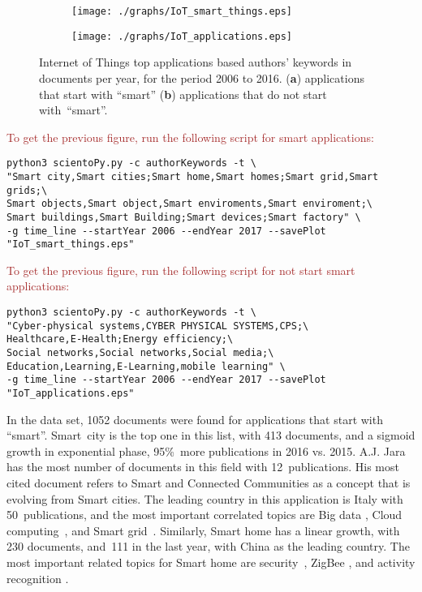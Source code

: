 \documentclass[symmetry,article,accept,moreauthors,pdftex10pt,a4paper]{mdpi}
\begin{document}
\begin{figure}[H]
	\centering
	\begin{subfigure}[b]{0.49\textwidth}
		\texttt{[image: ./graphs/IoT\_smart\_things.eps]}
		\caption{}
		\label{fig_smart_things}
	\end{subfigure}
	\begin{subfigure}[b]{0.49\textwidth}
		\texttt{[image: ./graphs/IoT\_applications.eps]}
		\caption{}
		\label{fig_applications_a}
	\end{subfigure}
	\vspace{-12pt}

	\caption{Internet of Things top applications based authors' keywords in documents per year, for the period 2006 to 2016.  (\textbf{a}) applications that start with ``smart'' (\textbf{b}) applications that do not start with~``smart''.}
	\label{fig_applications}
\end{figure}

\noindent
\textcolor{brown}{To get the previous figure, run the following script for smart applications:}\\
\begin{verbatim}
python3 scientoPy.py -c authorKeywords -t \
"Smart city,Smart cities;Smart home,Smart homes;Smart grid,Smart grids;\
Smart objects,Smart object,Smart enviroments,Smart enviroment;\
Smart buildings,Smart Building;Smart devices;Smart factory" \
-g time_line --startYear 2006 --endYear 2017 --savePlot "IoT_smart_things.eps"
\end{verbatim}

\noindent
\textcolor{brown}{To get the previous figure, run the following script for not start smart applications:}\\
\begin{verbatim}
python3 scientoPy.py -c authorKeywords -t \
"Cyber-physical systems,CYBER PHYSICAL SYSTEMS,CPS;\
Healthcare,E-Health;Energy efficiency;\
Social networks,Social networks,Social media;\
Education,Learning,E-Learning,mobile learning" \
-g time_line --startYear 2006 --endYear 2017 --savePlot "IoT_applications.eps"
\end{verbatim}

In the data set, 1052 documents were found for applications that start with ``smart''. Smart~city is the top one in this list, with 413 documents, and a sigmoid growth in exponential phase, 95\%~more publications in 2016 vs. 2015. A.J. Jara has the most number of documents in this field with 12~publications. His most cited document \cite{7406686} refers to Smart and Connected Communities as a concept that is evolving from Smart cities. The leading country in this application is Italy with 50~publications, and the most important correlated topics are Big data \cite{Li2014631,Moreno-Cano2015418,GomezRomero2016}, Cloud computing~\cite{Kaur2016,Chang201642}, and Smart grid~\cite{Longo2014458,Longo2015281}. Similarly, Smart home has a linear growth, with 230 documents, and~111 in the last year, with China as the leading country. The most important related topics for Smart home are security~\cite{UlRehman2016,Alohali2014115,Peter2017}, ZigBee \cite{Peng2016335,Yiqi2014114,Gong201689}, and activity recognition \cite{Cicirelli2016,Bourobou201511953,Fortino2015}.
\end{document}
